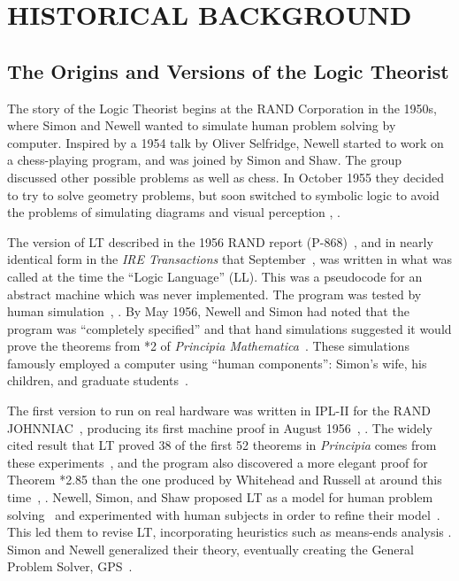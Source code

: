 \documentclass{IEEEcsmag}
\begin{document}
\section{HISTORICAL BACKGROUND}
\label{sec:history}

\subsection{The Origins and Versions of the Logic Theorist}

The story of the Logic Theorist begins at the RAND Corporation
in the 1950s, where Simon and Newell wanted to
simulate human problem solving by computer.  Inspired by a 1954 talk
by Oliver Selfridge, Newell started to work on a chess-playing
program, and was joined by Simon and Shaw.  The group discussed
other possible problems as well as chess. In October 1955 they decided to
try to solve geometry problems, but soon switched to
symbolic logic to avoid the problems of simulating diagrams and visual 
perception \cite{laird1991}, \cite[Ch.~13]{simon1996models}.

The version of LT described in the 1956 RAND report
(P-868)~\cite{LT1956a,LT1956b}, and in nearly identical form in the
\textit{IRE Transactions} that September~\cite{LT1956c}, was written in what
was called at the time the ``Logic Language'' (LL).  This was a
pseudocode for an abstract machine which was never implemented. The program
was tested  by human simulation~\cite[Ch.~13]{simon1996models}, 
\cite[p.~xx]{newell1964ipl}. By May
1956, Newell and Simon had noted that the program was ``completely
specified'' and that hand simulations suggested it would prove the
theorems from *2 of \textit{Principia
Mathematica}~\cite[p.~18]{cip1956}.  These simulations famously
employed a computer using ``human components'': Simon's wife, his children, and
graduate students~\cite[Ch.~13]{simon1996models}.

The first version to run on real hardware was written in IPL-II for
the RAND JOHNNIAC~\cite{newellshaw1957},
producing its first machine proof in August
1956~\cite[Ch.~13]{simon1996models}, \cite{newellshaw1957}. The widely cited result
that LT proved 38 of the first 52 theorems in \textit{Principia} comes 
from these experiments~\cite{LT1957}, and the program also discovered
a more elegant proof for Theorem *2.85 than the 
one produced by Whitehead and Russell at around this
time~\cite[Ch.~13]{simon1996models}, \cite{cip8jan1958}.
Newell, Simon, and Shaw proposed LT as a model 
for human problem solving~\cite{HPS1958}
and experimented with human subjects in order to refine
their model~\cite{PCT1959}. This led them to revise
LT, incorporating heuristics such as means-ends
analysis \cite{PCT1959}. Simon and Newell generalized their theory, eventually
creating the General Problem Solver,
GPS~\cite[p.~19]{SHT1959}.
\end{document}
